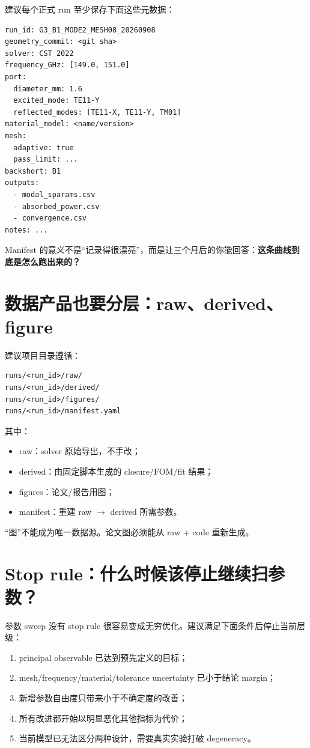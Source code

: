 \documentclass[11pt,a4paper,openany]{ctexrep}
\begin{document}
建议每个正式 run 至少保存下面这些元数据：
\begin{verbatim}
run_id: G3_B1_MODE2_MESH08_20260908
geometry_commit: <git sha>
solver: CST 2022
frequency_GHz: [149.0, 151.0]
port:
  diameter_mm: 1.6
  excited_mode: TE11-Y
  reflected_modes: [TE11-X, TE11-Y, TM01]
material_model: <name/version>
mesh:
  adaptive: true
  pass_limit: ...
backshort: B1
outputs:
  - modal_sparams.csv
  - absorbed_power.csv
  - convergence.csv
notes: ...
\end{verbatim}

\begin{intuitionbox}
Manifest 的意义不是“记录得很漂亮”，而是让三个月后的你能回答：\textbf{这条曲线到底是怎么跑出来的？}
\end{intuitionbox}

\section{数据产品也要分层：raw、derived、figure}

建议项目目录遵循：
\begin{verbatim}
runs/<run_id>/raw/
runs/<run_id>/derived/
runs/<run_id>/figures/
runs/<run_id>/manifest.yaml
\end{verbatim}
其中：
\begin{itemize}
  \item raw：solver 原始导出，不手改；
  \item derived：由固定脚本生成的 closure/FOM/fit 结果；
  \item figures：论文/报告用图；
  \item manifest：重建 raw $\rightarrow$ derived 所需参数。
\end{itemize}
“图”不能成为唯一数据源。论文图必须能从 raw + code 重新生成。

\section{Stop rule：什么时候该停止继续扫参数？}

参数 sweep 没有 stop rule 很容易变成无穷优化。建议满足下面条件后停止当前层级：
\begin{enumerate}
  \item principal observable 已达到预先定义的目标；
  \item mesh/frequency/material/tolerance uncertainty 已小于结论 margin；
  \item 新增参数自由度只带来小于不确定度的改善；
  \item 所有改进都开始以明显恶化其他指标为代价；
  \item 当前模型已无法区分两种设计，需要真实实验打破 degeneracy。
\end{enumerate}
\end{document}
